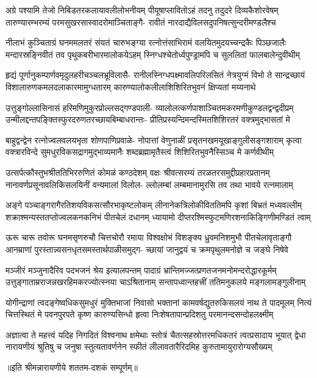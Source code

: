 

\fourlineindentedshloka
{अग्रे पश्यामि तेजो निबिडतरकलायावलीलोभनीयम्}
{पीयूषाप्लावितोऽहं तदनु तदुदरे दिव्यकैशोरवेषम्}
{तारुण्यारम्भरम्यं परमसुखरसास्वादरोमाञ्चिताङ्गै-}
{रावीतं नारदाद्यैविलसदुपनिषत्सुन्दरीमण्डलैश्च}

\fourlineindentedshloka
{नीलाभं कुञ्चिताग्रं घनममलतरं संयतं चारुभङ्ग्या}
{रत्नोत्तंसाभिरामं वलयितमुदयच्चन्द्रकैः पिञ्छजालैः}
{मन्दारस्रङ्निवीतं तव पृथुकबरीभारमालोकयेऽहम्}
{स्निग्धश्चेतोर्ध्वपुण्ड्रामपि च सुललितां फालबालेन्दुवीथीम्}

\fourlineindentedshloka
{हृद्यं पूर्णानुकम्पार्णवमृदुलहरीचञ्चलभ्रूविलासै-}
{रानीलस्निग्धपक्ष्मावलिपरिलसितं नेत्रयुग्मं विभो ते}
{सान्द्रच्छायं विशालारुणकमलदलाकारमामुग्धतारम्}
{कारुण्यालोकलीलाशिशिरितभुवनं क्षिप्यतां मय्यनाथे}

\fourlineindentedshloka
{उत्तुङ्गोल्लासिनासं हरिमणिमुकुरप्रोल्लसद्गण्डपाली-}
{व्यालोलत्कर्णपाशाञ्चितमकरमणीकुण्डलद्वन्द्वदीप्रम्}
{उन्मीलद्दन्तपङ्क्तिस्फुरदरुणतरच्छायबिम्बाधरान्तः-}
{प्रीतिप्रस्यन्दिमन्दस्मितशिशिरतरं वक्त्रमुद्भासतां मे}

\fourlineindentedshloka
{बाहुद्वन्द्वेन रत्नोज्वलवलयभृता शोणपाणिप्रवाळे-}
{नोपात्तां वेणुनाळीं प्रसृतनखमयूखाङ्गुलीसङ्गशाराम्}
{कृत्वा वक्त्रारविन्दे सुमधुरविकसद्रागमुद्भाव्यमानैः}
{शब्दब्रह्मामृतैस्त्वं शिशिरितभुवनैस्सिञ्च मे कर्णवीथीम्}

\fourlineindentedshloka
{उत्सर्पत्कौस्तुभश्रीततिभिररुणितं कोमळं कण्ठदेशम्}
{वक्षः श्रीवत्सरम्यं तरळतरसमुद्दीप्रहारप्रतानम्}
{नानावर्णप्रसूनावलिकिसलयिनीं वन्यमालां विलोल-}
{ल्लोलम्बां लम्बमानामुरसि तव तथा भावये रत्नमालाम्}

\fourlineindentedshloka
{अङ्गे पञ्चाङ्गरागैरतिशयविकसत्सौरभाकृष्टलोकम्}
{लीनानेकत्रिलोकीविततिमपि कृशां बिभ्रतं मध्यवल्लीम्}
{शक्राश्मन्यस्ततप्तोज्वलकनकनिभं पीतचेलं दधानम्}
{ध्यायामो दीप्तरश्मिस्फुटमणिरशनाकिङ्गिणीमण्डितं त्वाम्}

\fourlineindentedshloka
{ऊरू चारू तवोरू घनमसृणरुचौ चित्तचोरौ रमाया}
{विश्वक्षोभं विशङ्क्य ध्रुवमनिशमुभौ पीतचेलावृताङ्गौ}
{आनम्राणां पुरस्तान्न्यसनधृतसमस्तार्थपाळीसमुद्ग-}
{च्छायां जानुद्वयं च क्रमपृथुलमनोज्ञे च जङ्घे निषेवे}

\fourlineindentedshloka
{मञ्जीरं मञ्जुनादैरिव पदभजनं श्रेय इत्यालपन्तम्}
{पादाग्रं भ्रान्तिमज्जत्प्रणतजनमनोमन्दरोद्धारकूर्मम्}
{उत्तुङ्गाताम्रराजन्नखरहिमकरज्योत्स्नया चाऽश्रितानाम्}
{सन्तापध्वान्तहत्त्रीं ततिमनुकलये मङ्गलामङ्गुलीनाम्}

\fourlineindentedshloka
{योगीन्द्राणां त्वदङ्गेष्वधिकसुमधुरं मुक्तिभाजां निवासो}
{भक्तानां कामवर्षद्युतरुकिसलयं नाथ ते पादमूलम्}
{नित्यं चित्तस्थितं मे पवनपुरपते कृष्ण कारुण्यसिन्धो}
{हृत्वा निःशेषतापान्प्रदिशतु परमानन्दसन्दोहलक्ष्मीम्}

\fourlineindentedshloka
{अज्ञात्वा ते महत्त्वं यदिह निगदितं विश्वनाथ क्षमेथाः}
{स्तोत्रं चैतत्सहस्रोत्तरमधिकतरं त्वत्प्रसादाय भूयात्}
{द्वेधा नारायणीयं श्रुतिषु च जनुषा स्तुत्यतावर्णनेन}
{स्फीतं लीलावतारैरिदमिह कुरुतामायुरारोग्यसौख्यम्}

{॥इति श्रीमन्नारायणीये शततम-दशकं सम्पूर्णम्॥}
